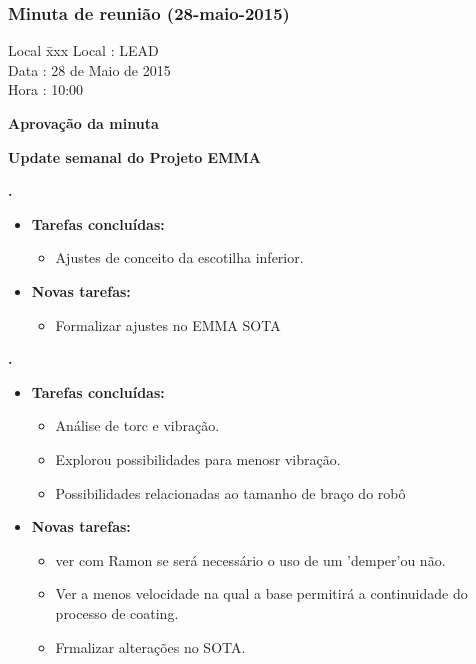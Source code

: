 \subsubsection{Minuta de reunião (28-maio-2015)}

\begin{tabbing}
  Local \= xxx \kill
  Local \> : LEAD \\
  Data  \> : 28 de Maio de 2015 \\
  Hora  \> : 10:00
\end{tabbing}


\textbf{Aprovação da minuta}

\textbf{Update semanal do Projeto EMMA}
  
\textbf{\renan.} 
	\begin{itemize}
		\item \textbf{Tarefas concluídas:}
			\begin{itemize}    
				\item Ajustes de conceito da escotilha inferior.
			\end{itemize}
		
		\item \textbf{Novas tarefas:}
			\begin{itemize} 
				\item Formalizar ajustes no EMMA SOTA
			\end{itemize}
	\end{itemize}
	
\textbf{\elael.} 
    \begin{itemize}    
		\item \textbf{Tarefas concluídas:}
			\begin{itemize}
				\item Análise de torc e vibração.
				\item Explorou possibilidades para menosr vibração.
				\item Possibilidades relacionadas ao tamanho de braço do robô
			\end{itemize}
			
		\item \textbf{Novas tarefas:}
			\begin{itemize} 
				\item ver com Ramon se será necessário o uso de um 'demper'ou não.
				\item Ver a menos velocidade na qual a base permitirá a continuidade do
				processo de coating.
				\item Frmalizar alterações no SOTA.
			\end{itemize}
	\end{itemize}
	
